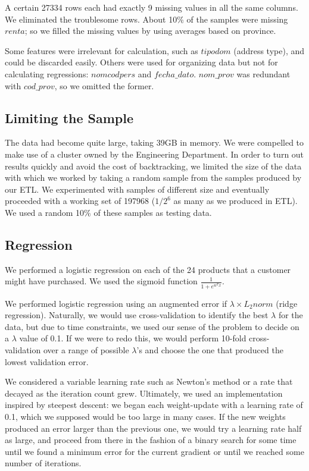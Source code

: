 \documentclass{article}
\begin{document}
\begin{spacing}{1}
\begin{large}
A certain 27334 rows each had exactly 9 missing values in all the same columns. We eliminated the troublesome rows. About 10\% of the samples were missing $renta$; so we filled the missing values by using averages based on province.

Some features were irrelevant for calculation, such as $tipodom$ (address type), and could be discarded easily. Others were used for organizing data but not for calculating regressions: $nomcodpers$ and $fecha\_dato$. $nom\_prov$ was redundant with $cod\_prov$, so we omitted the former.

\subsection{Limiting the Sample}

The data had become quite large, taking 39GB in memory. We were compelled to make use of a cluster owned by the Engineering Department. In order to turn out results quickly and avoid the cost of backtracking, we limited the size of the data with which we worked by taking a random sample from the samples produced by our ETL. We experimented with samples of different size and eventually proceeded with a working set of 197968 ($1/2^6$ as many as we produced in ETL). We used a random 10\% of these samples as testing data.

\subsection{Regression}

We performed a logistic regression on each of the 24 products that a customer might have purchased. We used the sigmoid function $\frac{1}{1+e^{w^Tx}}$.

We performed logistic regression using an augmented error if $\lambda \times L_2norm$ (ridge regression). Naturally, we would use cross-validation to identify the best $\lambda$ for the data, but due to time constraints, we used our sense of the problem to decide on a $\lambda$ value of 0.1. If we were to redo this, we would perform 10-fold cross-validation over a range of possible $\lambda$'s and choose the one that produced the lowest validation error.

We considered a variable learning rate such as Newton's method or a rate that decayed as the iteration count grew. Ultimately, we used an implementation inspired by steepest descent: we began each weight-update with a learning rate of 0.1, which we supposed would be too large in many cases. If the new weights produced an error larger than the previous one, we would try a learning rate half as large, and proceed from there in the fashion of a binary search for some time until we found a minimum error for the current gradient or until we reached some number of iterations.


\end{large}
\end{spacing}
\end{document}
